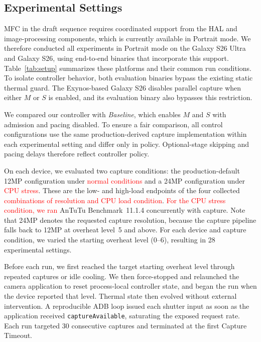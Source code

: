 \subsection{Experimental Settings}
\label{sec:setup}

MFC in the draft sequence requires coordinated support from the HAL and image-processing components, which is currently available in Portrait mode.
We therefore conducted all experiments in Portrait mode on the Galaxy S26 Ultra and Galaxy S26, using end-to-end binaries that incorporate this support.
Table~\ref{tab:setup} summarizes these platforms and their common run conditions.
To isolate controller behavior, both evaluation binaries bypass the existing static thermal guard.
The Exynos-based Galaxy S26 disables parallel capture when either \(M\) or \(S\) is enabled, and its evaluation binary also bypasses this restriction.

We compared our controller with \emph{Baseline}, which enables \(M\) and \(S\) with admission and pacing disabled.
To ensure a fair comparison, all control configurations use the same production-derived capture implementation within each experimental setting and differ only in policy.
Optional-stage skipping and pacing delays therefore reflect controller policy.

On each device, we evaluated two capture conditions: the production-default 12MP configuration under \textcolor{red}{normal conditions} and a 24MP configuration under \textcolor{red}{CPU stress}.
These are the low- and high-load endpoints of the four collected \textcolor{red}{combinations of resolution and CPU load condition}.
\textcolor{red}{For the CPU stress condition, we ran} AnTuTu Benchmark~11.1.4 concurrently with capture.
Note that 24MP denotes the requested capture resolution, because the capture pipeline falls back to 12MP at overheat level~5 and above.
For each device and capture condition, we varied the starting overheat level (0--6), resulting in 28 experimental settings.

Before each run, we first reached the target starting overheat level through repeated captures or idle cooling.
We then force-stopped and relaunched the camera application to reset process-local controller state, and began the run when the device reported that level.
Thermal state then evolved without external intervention.
A reproducible ADB loop issued each shutter input as soon as the application received \texttt{captureAvailable}, saturating the exposed request rate.
Each run targeted 30 consecutive captures and terminated at the first Capture Timeout.

